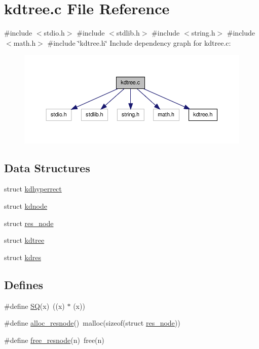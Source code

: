 \hypertarget{a00013}{\section{kdtree.\-c \-File \-Reference}
\label{d7/dd4/a00013}
}
{\ttfamily \#include $<$stdio.\-h$>$}\*
{\ttfamily \#include $<$stdlib.\-h$>$}\*
{\ttfamily \#include $<$string.\-h$>$}\*
{\ttfamily \#include $<$math.\-h$>$}\*
{\ttfamily \#include \char`\"{}kdtree.\-h\char`\"{}}\*
\-Include dependency graph for kdtree.\-c\-:
\nopagebreak
\begin{figure}[H]
\begin{center}
\leavevmode
\includegraphics[width=350pt]{d3/d52/a00023}
\end{center}
\end{figure}
\subsection*{\-Data \-Structures}
\begin{DoxyCompactItemize}
\item 
struct \hyperlink{a00008}{kdhyperrect}
\item 
struct \hyperlink{a00009}{kdnode}
\item 
struct \hyperlink{a00012}{res\-\_\-node}
\item 
struct \hyperlink{a00011}{kdtree}
\item 
struct \hyperlink{a00010}{kdres}
\end{DoxyCompactItemize}
\subsection*{\-Defines}
\begin{DoxyCompactItemize}
\item 
\#define \hyperlink{a00013_ac3644f84794a8bfdacf39c4b2c2495fc_ac3644f84794a8bfdacf39c4b2c2495fc}{\-S\-Q}(x)~((x) $\ast$ (x))
\item 
\#define \hyperlink{a00013_aeb41ddbd68313adcb5129add2c4428d0_aeb41ddbd68313adcb5129add2c4428d0}{alloc\-\_\-resnode}()~malloc(sizeof(struct \hyperlink{a00012}{res\-\_\-node}))
\item 
\#define \hyperlink{a00013_aa809c41131ed043aab5ea2f7806fa458_aa809c41131ed043aab5ea2f7806fa458}{free\-\_\-resnode}(n)~free(n)
\end{DoxyCompactItemize}
